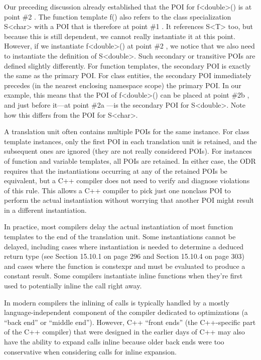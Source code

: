 Our preceding discussion already established that the POI for f<double>() is at point \#2 . The function template f() also refers to the class specialization S<char> with a POI that is therefore at point \#1 . It references S<T> too, but because this is still dependent, we cannot really instantiate it at this point. However, if we instantiate f<double>() at point \#2 , we notice that we also need to instantiate the definition of S<double>. Such secondary or transitive POIs are defined slightly differently. For function templates, the secondary POI is exactly the same as the primary POI. For class entities, the secondary POI immediately precedes (in the nearest enclosing namespace scope) the primary POI. In our example, this means that the POI of f<double>() can be placed at point \#2b , and just before it—at point \#2a —is the secondary POI for S<double>. Note how this differs from the POI for S<char>.

A translation unit often contains multiple POIs for the same instance. For class template instances, only the first POI in each translation unit is retained, and the subsequent ones are ignored (they are not really considered POIs). For instances of function and variable templates, all POIs are retained. In either case, the ODR requires that the instantiations occurring at any of the retained POIs be equivalent, but a C++ compiler does not need to verify and diagnose violations of this rule. This allows a C++ compiler to pick just one nonclass POI to perform the actual instantiation without worrying that another POI might result in a different instantiation.

In practice, most compilers delay the actual instantiation of most function templates to the end of the translation unit. Some instantiations cannot be delayed, including cases where instantiation is needed to determine a deduced return type (see Section 15.10.1 on page 296 and Section 15.10.4 on page 303) and cases where the function is constexpr and must be evaluated to produce a constant result. Some compilers instantiate inline functions when they’re first used to potentially inline the call right away.

\begin{tcolorbox}[colback=webgreen!5!white,colframe=webgreen!75!black]
\hspace*{0.75cm}In modern compilers the inlining of calls is typically handled by a mostly language-independent component of the compiler dedicated to optimizations (a “back end” or “middle end”). However, C++ “front ends” (the C++-specific part of the C++ compiler) that were designed in the earlier days of C++ may also have the ability to expand calls inline because older back ends were  too conservative when considering calls for inline expansion.
\end{tcolorbox}

